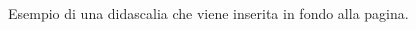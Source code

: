 \documentclass[hidelinks,12pt,a4paper]{article}
\begin{document}
\begin{adjustwidth}{-30mm}{-30mm}
	\vspace{4mm}
	
		\begin{minipage}{\linewidth}
		\hfill{
		}
	\end{minipage}
	\end{adjustwidth}

	
	\vspace*{\fill}
	\centering
	\fboxrule=2pt
	\fbox
	{
		\begin{minipage}{\linewidth}
		Esempio di una didascalia che viene inserita in fondo alla pagina.
		\end{minipage}
	}
	
\end{document}
